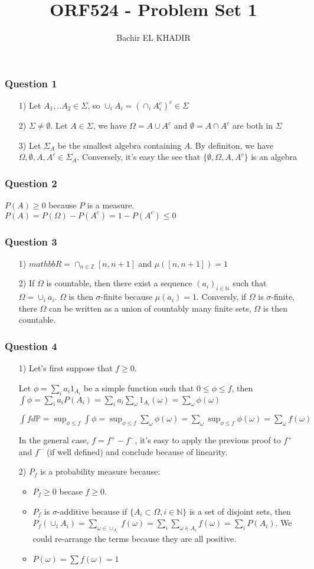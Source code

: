 \documentclass[12pt]{article}
\title{ORF524 - Problem Set 1}
\author{Bachir EL KHADIR }
\newcommand{\Q}[1]{\subsubsection*{Question #1}}
\begin{document}
\maketitle

\Q{1}
\begin{itemize}
\item [1)] Let $A_1, ..A_2 \in \Sigma$, so $\cup_i A_i = (\cap_i A_i^c)^c \in \Sigma$
\item [2)] $\Sigma \neq \emptyset$. Let $A \in \Sigma$, we have $\Omega = A \cup A^c$ and $\emptyset = A \cap A^c$ are both in $\Sigma$
\item [3)] Let $\Sigma_A$ be the smallest algebra containing $A$. By definiton, we have $\Omega, \emptyset, A, A^c \in \Sigma_A$. Conversely, it's easy the see that $\{\emptyset, \Omega, A, A^c\}$ is an algebra
\end{itemize}


\Q{2}
$P(A) \geq 0$ because $P$ is a measure.
$P(A) = P(\Omega) - P(A^c) = 1 - P(A^c) \leq 0 $


\Q{3}
\begin{itemize}
\item [1)] $mathbb{R} = \cap_{n \in \mathbb{Z}} [n, n+1]$ and $\mu([n, n+1]) = 1$
\item [2)] If $\Omega$ is countable, then there exist a sequence $(a_i)_{i \in \mathbb{N}}$ such that $\Omega = \cup_i {a_i}$. $\Omega$ is then $\sigma$-finite because $\mu({a_i}) = 1$. Conversly, if $\Omega$ is  $\sigma$-finite, there $\Omega$ can be written as a union of countably many finite sets, $\Omega$ is then countable.
\end{itemize}

\Q{4}
\begin{itemize}
\item [1)]
  Let's first suppose that $f \geq 0$.

  Let $\phi = \sum_i a_i 1_{A_i}$ be a simple function such that $0 \leq \phi \leq f$,
  then $\int \phi = \sum_i a_i P(A_i) = \sum_i a_i \sum_{\omega} 1_{A_i}(\omega) = \sum_{\omega} \phi(\omega)$
  
  $\int f d\mathbb{P} = \sup_{\phi \leq f} \int \phi = \sup_{\phi \leq f} \sum_{\omega} \phi(\omega) = \sum_{\omega}  \sup_{\phi \leq f} \phi(\omega) = \sum_{\omega} f(\omega)$

  In the general case, $f = f^+ - f^-$, it's easy to apply the previous proof to $f^+$ and $f^-$ (if well defined) and conclude because of linearity.
  
\item [2)] $P_f$ is a probability measure because:
  \begin{itemize}
  \item $P_f \geq 0$ becase $f \geq 0$.
  \item $P_f$ is $\sigma$-additive because if $\{A_i \subset \Omega, i \in \mathbb{N}\}$ is a set of disjoint sets, then $P_f(\cup_i A_i) = \sum_{\omega \in \cup_{A_i}} f(\omega) = \sum_i \sum_{\omega \in A_i} f(\omega) = \sum_i P(A_i)$. We could re-arrange the terms because they are all positive.
  \item $P(\omega) = \sum f(\omega) = 1$
  \end{itemize}

  
\end{itemize}
\end{document}
